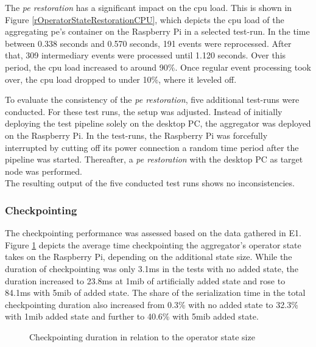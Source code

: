 The \textit{\acrshort{pe} restoration} has a significant impact on the \gls{cpu} load. This is shown in Figure \ref{rOperatorStateRestorationCPU}, which depicts the \gls{cpu} load of the aggregating \gls{pe}'s container on the Raspberry Pi in a selected test-run. In the time between 0.338 seconds and 0.570 seconds, 191 events were reprocessed. After that, 309 intermediary events were processed until 1.120 seconds. Over this period, the \gls{cpu} load increased to around 90\%. Once regular event processing took over, the \gls{cpu} load dropped to under 10\%, where it leveled off.\par

To evaluate the consistency of the \textit{\acrshort{pe} restoration}, five additional test-runs were conducted. For these test runs, the setup was adjusted. Instead of initially deploying the test pipeline solely on the desktop PC, the aggregator was deployed on the Raspberry Pi. In the test-runs, the Raspberry Pi was forcefully interrupted by cutting off its power connection a random time period after the pipeline was started. Thereafter, a \textit{\acrshort{pe} restoration} with the desktop PC as target node was performed.\\
The resulting output of the five conducted test runs shows no inconsistencies.


\subsubsection{Checkpointing}
\label{lResultsCheckpointing}
The checkpointing performance was assessed based on the data gathered in E1. Figure \ref{rCheckpointingDuration} depicts the average time checkpointing the aggregator's operator state takes on the Raspberry Pi, depending on the additional state size. While the duration of checkpointing was only 3.1ms in the tests with no added state, the duration increased to 23.8ms at 1\gls{mib} of artificially added state and rose to 84.1ms with 5\gls{mib} of added state. The share of the serialization time in the total checkpointing duration also increased from 0.3\% with no added state to 32.3\% with 1\gls{mib} added state and further to 40.6\% with 5\gls{mib} added state. 

\begin{figure}[H]
    \centering
    \graphicspath{{./figures/code/}}
    
    \caption{Checkpointing duration in relation to the operator state size}
    \label{rCheckpointingDuration}
\end{figure}


